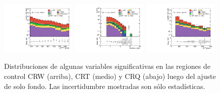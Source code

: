 \begin{figure}[ht!]
\begin{center}
    \includegraphics[width=0.32\textwidth]{images/results/fr2_unblind/can_CRQ_ph_pt0_afterFit.pdf}
    \includegraphics[width=0.32\textwidth]{images/results/fr2_unblind/can_CRQ_jet_n_afterFit.pdf}
    \includegraphics[width=0.32\textwidth]{images/results/fr2_unblind/can_CRQ_met_et_afterFit.pdf}

    \caption{Distribuciones de algunas variables significativas en las regiones de control CRW (arriba), CRT (medio) y CRQ (abajo) luego del ajuste de solo fondo. Las incertidumbre mostradas son sólo estadísticas.}
    \label{fig:cr_dist}
  \end{center}
\end{figure}



